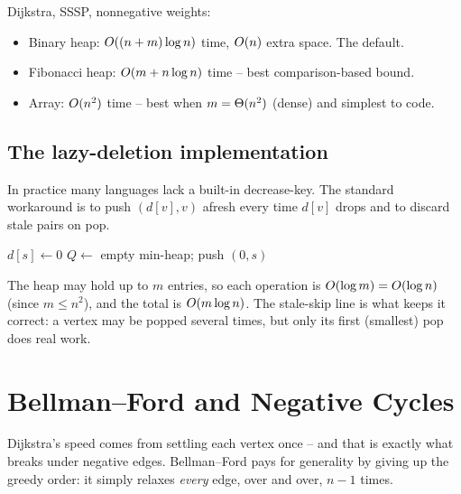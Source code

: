 \begin{complexitybox}
Dijkstra, SSSP, nonnegative weights:
\begin{itemize}
  \item Binary heap: $O((n+m)\log n)$ time, $O(n)$ extra space. The default.
  \item Fibonacci heap: $O(m+n\log n)$ time -- best comparison-based bound.
  \item Array: $O(n^2)$ time -- best when $m=\Theta(n^2)$ (dense) and simplest to code.
\end{itemize}
\end{complexitybox}

\subsection{The lazy-deletion implementation}

In practice many languages lack a built-in decrease-key. The standard workaround is to push
$(d[v],v)$ afresh every time $d[v]$ drops and to discard stale pairs on pop.

\begin{algorithm}[H]
\DontPrintSemicolon
\caption{\textsc{Dijkstra-Lazy}$(\Gph,w,s)$ -- binary heap, no decrease-key}
 \quad $d[s]\gets 0$\;
$Q\gets$ empty min-heap; push $(0,s)$\;
\end{algorithm}

The heap may hold up to $m$ entries, so each operation is $O(\log m)=O(\log n)$ (since
$m\le n^2$), and the total is $O(m\log n)$. The stale-skip line is what keeps it correct:
a vertex may be popped several times, but only its first (smallest) pop does real work.

\section{Bellman--Ford and Negative Cycles}
\label{ch07:bellman-ford}

Dijkstra's speed comes from settling each vertex once -- and that is exactly what breaks
under negative edges. Bellman--Ford pays for generality by giving up the greedy order: it
simply relaxes \emph{every} edge, over and over, $n-1$ times.

